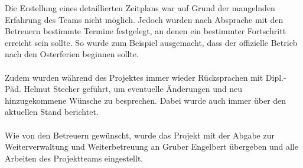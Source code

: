 Die Erstellung eines detaillierten Zeitplans war auf Grund der mangelnden Erfahrung des Teams nicht möglich. Jedoch wurden nach Absprache mit den Betreuern bestimmte Termine festgelegt, an denen ein bestimmter Fortschritt erreicht sein sollte. So wurde zum Beispiel ausgemacht, dass der offizielle Betrieb nach den Osterferien beginnen sollte.\\\\
Zudem wurden während  des Projektes immer wieder Rücksprachen mit Dipl.-Päd. Helmut Stecher geführt, um eventuelle Änderungen und neu hinzugekommene Wünsche zu besprechen. Dabei wurde auch immer über den aktuellen Stand berichtet.\\\\
Wie von den Betreuern gewünscht, wurde das Projekt mit der Abgabe zur Weiterverwaltung und Weiterbetreuung an Gruber Engelbert übergeben und alle Arbeiten des Projektteams eingestellt.